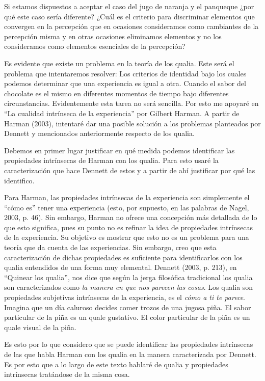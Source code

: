 \documentclass[]{book}
\begin{document}
Si estamos dispuestos a aceptar el caso del jugo de naranja y el
panqueque ¿por qué este caso sería diferente? ¿Cuál es el criterio para
discriminar elementos que convergen en la percepción que en ocasiones
consideramos como cambiantes de la percepción misma y en otras ocasiones
eliminamos elementos y no los consideramos como elementos esenciales de
la percepción?

Es evidente que existe un problema en la teoría de los qualia. Este será
el problema que intentaremos resolver: Los criterios de identidad bajo
los cuales podemos determinar que una experiencia es igual a otra.
Cuando el sabor del chocolate es el mismo en diferentes momentos de
tiempo bajo diferentes circunstancias. Evidentemente esta tarea no será
sencilla. Por esto me apoyaré en ``La cualidad intrínseca de la
experiencia'' por Gilbert Harman. A partir de Harman (2003), intentaré
dar una posible solución a los problemas planteados por Dennett y
mencionados anteriormente respecto de los qualia.

Debemos en primer lugar justificar en qué medida podemos identificar las
propiedades intrínsecas de Harman con los qualia. Para esto usaré la
caracterización que hace Dennett de estos y a partir de ahí justificar
por qué las identifico.

Para Harman, las propiedades intrínsecas de la experiencia son
simplemente el ``cómo es'' tener una experiencia (esto, por supuesto, en
las palabras de Nagel, 2003, p. 46). Sin embargo, Harman no ofrece una
concepción más detallada de lo que esto significa, pues su punto no es
refinar la idea de propiedades intrínsecas de la experiencia. Su
objetivo es mostrar que esto no es un problema para una teoría que da
cuenta de las experiencias. Sin embargo, creo que esta caracterización
de dichas propiedades es suficiente para identificarlos con los qualia
entendidos de una forma muy elemental. Dennett (2003, p. 213), en
``Quinear los qualia'', nos dice que según la jerga filosófica
tradicional los qualia son caracterizados como \emph{la manera en que
nos parecen las cosas}. Los qualia son propiedades subjetivas
intrínsecas de la experiencia, es el \emph{cómo a ti te parece}. Imagina
que un día caluroso decides comer trozos de una jugosa piña. El sabor
particular de la piña es un quale gustativo. El color particular de la
piña es un quale visual de la piña.

Es esto por lo que considero que se puede identificar las propiedades
intrínsecas de las que habla Harman con los qualia en la manera
caracterizada por Dennett. Es por esto que a lo largo de este texto
hablaré de qualia y propiedades intrínsecas tratándose de la misma cosa.
\end{document}

